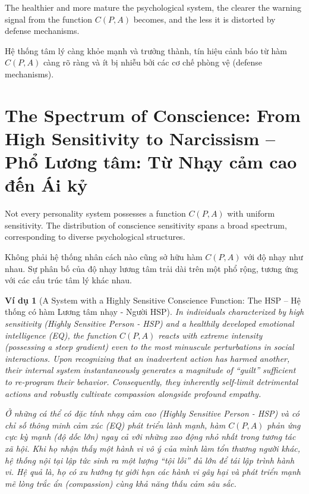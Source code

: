 \documentclass{report}
\newtheorem{vidu}{Ví dụ}
\begin{document}
The healthier and more mature the psychological system, the clearer the warning signal from the function $C(P, A)$ becomes, and the less it is distorted by defense mechanisms.

Hệ thống tâm lý càng khỏe mạnh và trưởng thành, tín hiệu cảnh báo từ hàm $C(P, A)$ càng rõ ràng và ít bị nhiễu bởi các cơ chế phòng vệ (defense mechanisms).

\section{The Spectrum of Conscience: From High Sensitivity to Narcissism -- Phổ Lương tâm: Từ Nhạy cảm cao đến Ái kỷ}

Not every personality system possesses a function $C(P, A)$ with uniform sensitivity. The distribution of conscience sensitivity spans a broad spectrum, corresponding to diverse psychological structures.

Không phải hệ thống nhân cách nào cũng sở hữu hàm $C(P, A)$ với độ nhạy như nhau. Sự phân bố của độ nhạy lương tâm trải dài trên một phổ rộng, tương ứng với các cấu trúc tâm lý khác nhau.

\begin{vidu}[A System with a Highly Sensitive Conscience Function: The HSP -- Hệ thống có hàm Lương tâm nhạy - Người HSP]
	In individuals characterized by high sensitivity (Highly Sensitive Person - HSP) and a healthily developed emotional intelligence (EQ), the function $C(P, A)$ reacts with extreme intensity (possessing a steep gradient) even to the most minuscule perturbations in social interactions. Upon recognizing that an inadvertent action has harmed another, their internal system instantaneously generates a magnitude of ``guilt'' sufficient to re-program their behavior. Consequently, they inherently self-limit detrimental actions and robustly cultivate compassion alongside profound empathy.
	
	Ở những cá thể có đặc tính nhạy cảm cao (Highly Sensitive Person - HSP) và có chỉ số thông minh cảm xúc (EQ) phát triển lành mạnh, hàm $C(P, A)$ phản ứng cực kỳ mạnh (độ dốc lớn) ngay cả với những xao động nhỏ nhất trong tương tác xã hội. Khi họ nhận thấy một hành vi vô ý của mình làm tổn thương người khác, hệ thống nội tại lập tức sinh ra một lượng ``tội lỗi'' đủ lớn để tái lập trình hành vi. Hệ quả là, họ có xu hướng tự giới hạn các hành vi gây hại và phát triển mạnh mẽ lòng trắc ẩn (compassion) cùng khả năng thấu cảm sâu sắc.
\end{vidu}
\end{document}
